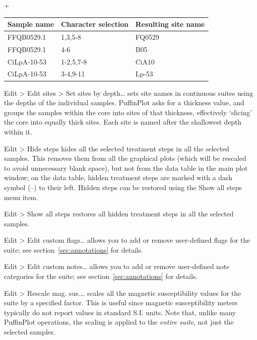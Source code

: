 \documentclass[a4paper,british]{article}
\newcommand{\menuitemlabel}[1]{%
\mbox{\textsf{#1}}\hfil}
\newenvironment{menuitemlist}%
{\begin{list}{}{%
\renewcommand{\makelabel}{\menuitemlabel}%
\setlength{\labelwidth}{35pt}%
\setlength{\leftmargin}%
             {\labelwidth+\labelsep}}}%
{\end{list}}
\newcommand{\ppcmd}[1]{\textsf{#1}} %
\newcommand{\submenu}{ \textgreater{} } %
\begin{document}
\begin{menuitemlist}
\begin{tabular}{lll} \toprule
Sample name & Character selection & Resulting site name \\ \midrule
FFQB0529.1 & 1,3,5-8 & FQ0529 \\
FFQB0529.1 & 4-6 & B05 \\
CiLpA-10-53 & 1-2,5,7-8 & CiA10 \\
CiLpA-10-53 & 3-4,9-11 & Lp-53 \\
\bottomrule \end{tabular}

\item[Edit\submenu Edit sites\submenu Set sites by depth\ldots] sets site
  names in continuous suites using the depths of the individual samples.
  PuffinPlot asks for a thickness value, and groups the samples within the
  core into sites of that thickness, effectively `slicing' the core into
  equally thick sites. Each site is named after the shallowest depth within
  it.

\item[Edit\submenu Hide steps] hides all the selected treatment steps in all
  the selected samples. This removes them from all the graphical plots (which
  will be rescaled to avoid unnecessary blank space), but not from the data
  table in the main plot window; on the data table, hidden treatment steps
  are marked with a dash symbol (--) to their left. Hidden steps can be
  restored using the \ppcmd{Show all steps} menu item.

\item[Edit\submenu Show all steps] restores all hidden treatment steps in all
  the selected samples.

\item[Edit\submenu Edit custom flags\ldots] allows you to add or remove
  user-defined flags for the suite; see section~\ref{sec:annotations} for
  details.

\item[Edit\submenu Edit custom notes\ldots] allows you to add or remove
  user-defined note categories for the suite; see
  section~\ref{sec:annotations} for details.

\item[Edit\submenu Rescale mag. sus.\ldots] scales all the magnetic
  susceptibility values for the suite by a specified factor. This is useful
  since magnetic susceptibility meters typically do not report values in
  standard S.I. units. Note that, unlike many PuffinPlot operations, the
  scaling is applied to the {\em entire suite}, not just the selected
  samples.


\end{menuitemlist}
\end{document}
